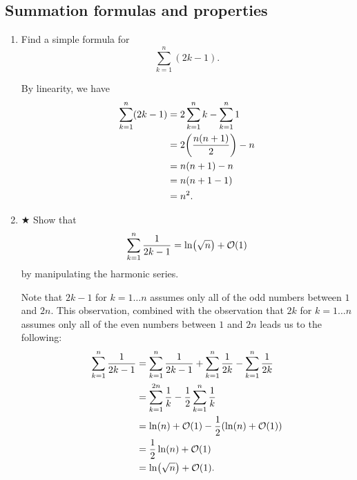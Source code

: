 \documentclass[AppendixA]{subfiles}
\begin{document}
	\subsection{Summation formulas and properties}

	\begin{enumerate}
		\item Find a simple formula for
		\[
			\sum_{k = 1}^n (2k - 1).
		\]
		\begin{answer}
			By linearity, we have
			\begin{align*}
				\sum_{k = 1}^n (2k - 1) &= 2 \sum_{k = 1}^n k - \sum_{k = 1}^n 1\\
					&= 2 \qty(\frac{n(n+1)}{2}) - n\\
					&= n(n+1) - n\\
					&= n(n+1 - 1)\\
					&= n^2.
			\end{align*}
		\end{answer}

		\item $\bigstar$ Show that
		\[
			\sum_{k = 1}^n \frac{1}{2k - 1} = \ln(\sqrt{n}) + \mathcal{O}(1)
		\]
		by manipulating the harmonic series.
		\begin{answer}
			Note that $2k - 1$ for $k = 1 \dots n$ assumes only all of the odd numbers between $1$ and $2n$. This observation, combined with the observation that $2k$ for $k = 1 \dots n$ assumes only all of the even numbers between $1$ and $2n$ leads us to the following:
			\begin{align*}
				\sum_{k = 1}^n \frac{1}{2k - 1} &= \sum_{k = 1}^n \frac{1}{2k - 1} + \sum_{k = 1}^n \frac{1}{2k} - \sum_{k = 1}^n \frac{1}{2k}\\
					&= \sum_{k = 1}^{2n} \frac{1}{k} - \frac{1}{2}\sum_{k = 1}^n \frac{1}{k}\\
					&= \ln(n) + \mathcal{O}(1) - \frac{1}{2}\qty(\ln(n) + \mathcal{O}(1))\\
					&= \frac{1}{2} \ln(n) + \mathcal{O}(1)\\
					&= \ln(\sqrt{n}) + \mathcal{O}(1).
			\end{align*}
		\end{answer}
		

\end{enumerate}
\end{document}
